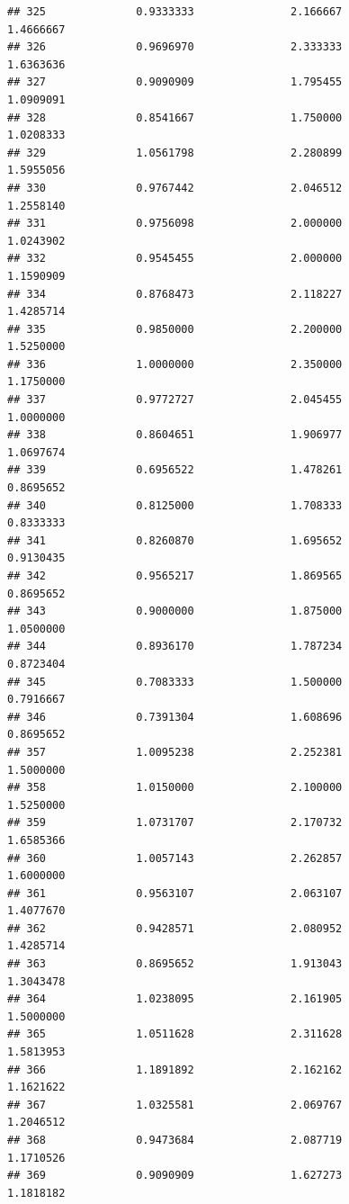 \documentclass[]{article}
\begin{document}
\begin{verbatim}
## 325              0.9333333               2.166667                1.4666667
## 326              0.9696970               2.333333                1.6363636
## 327              0.9090909               1.795455                1.0909091
## 328              0.8541667               1.750000                1.0208333
## 329              1.0561798               2.280899                1.5955056
## 330              0.9767442               2.046512                1.2558140
## 331              0.9756098               2.000000                1.0243902
## 332              0.9545455               2.000000                1.1590909
## 334              0.8768473               2.118227                1.4285714
## 335              0.9850000               2.200000                1.5250000
## 336              1.0000000               2.350000                1.1750000
## 337              0.9772727               2.045455                1.0000000
## 338              0.8604651               1.906977                1.0697674
## 339              0.6956522               1.478261                0.8695652
## 340              0.8125000               1.708333                0.8333333
## 341              0.8260870               1.695652                0.9130435
## 342              0.9565217               1.869565                0.8695652
## 343              0.9000000               1.875000                1.0500000
## 344              0.8936170               1.787234                0.8723404
## 345              0.7083333               1.500000                0.7916667
## 346              0.7391304               1.608696                0.8695652
## 357              1.0095238               2.252381                1.5000000
## 358              1.0150000               2.100000                1.5250000
## 359              1.0731707               2.170732                1.6585366
## 360              1.0057143               2.262857                1.6000000
## 361              0.9563107               2.063107                1.4077670
## 362              0.9428571               2.080952                1.4285714
## 363              0.8695652               1.913043                1.3043478
## 364              1.0238095               2.161905                1.5000000
## 365              1.0511628               2.311628                1.5813953
## 366              1.1891892               2.162162                1.1621622
## 367              1.0325581               2.069767                1.2046512
## 368              0.9473684               2.087719                1.1710526
## 369              0.9090909               1.627273                1.1818182

\end{verbatim}
\end{document}
